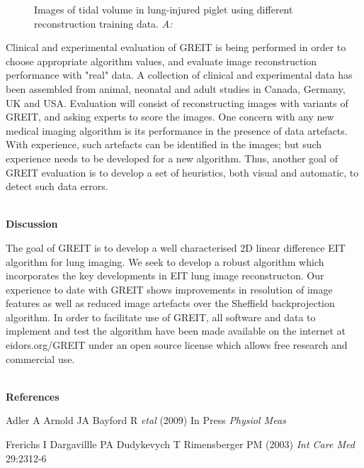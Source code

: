 \documentclass[12pt]{article}
\newcommand{\mysection}[1]{
~\\ \noindent
{\bf \normalsize #1}
\vspace{1mm}
}
\begin{document}
\begin{figure}[htp]
\centering
\vspace{-6mm}
\caption{%
\small
Images of tidal volume in lung-injured piglet
\cite{frerichs03} using different reconstruction
training data.
{\em A:} 
}
\label{fig:figbackgnd}
\end{figure}

Clinical and experimental evaluation of GREIT is being
performed in order to choose appropriate algorithm values,
and evaluate image reconstruction performance with "real"
data. A collection of clinical and experimental data has
been assembled from animal, neonatal  and adult studies
in Canada, Germany, UK and USA. Evaluation will consist
of reconstructing images with variants of GREIT, and
asking experts to score the images.  One concern with any
new medical imaging algorithm is its performance in the
presence of data artefacts. With experience, such artefacts
can be identified in the images; but such experience needs
to be developed for a new algorithm.  Thus, another goal
of GREIT evaluation is to develop a set of heuristics,
both visual and automatic, to detect such data errors.


\vspace{-3mm}
\mysection{Discussion}

The goal of GREIT is to develop a well characterised 2D
linear difference EIT algorithm for lung imaging. We seek to develop
a robust algorithm which incorporates the key developments
in EIT lung image reconstructon. Our experience to date
with GREIT shows improvements in resolution of image features
as well as reduced image artefacts over the Sheffield backprojection
algorithm. In order to facilitate use of GREIT,
all software
and data to implement and test the algorithm have been
made available on the internet at eidors.org/GREIT under
an open source license which allows free research and
commercial use.

\mysection{References}
\begin{thebibliography}{9}
\setlength{\itemsep}{-2mm}
\vspace{-1.8cm}
Adler A  Arnold JA Bayford R {\em etal} (2009)
In Press {\em Physiol Meas}

Frerichs I Dargavillle PA Dudykevych T Rimensberger PM (2003) 
{\em Int Care Med} 29:2312-6

\end{thebibliography}
\end{document}
